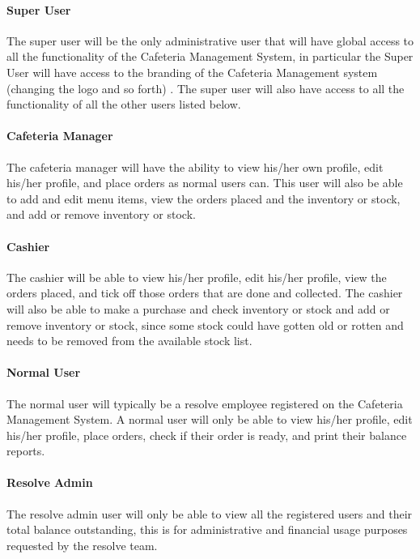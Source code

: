 \documentclass[12pt]{article}
\begin{document}
\paragraph{Super User\\}
The super user will be the only administrative user that will have global access to all the functionality of the Cafeteria Management System, in particular the Super User will have access to the branding of the Cafeteria Management system (changing the logo and so forth) . The super user will also have access to all the functionality of all the other users listed below.

\paragraph{ Cafeteria Manager\\}
The cafeteria manager will have the ability to view his/her own profile, edit his/her profile, and place orders as normal users can. This user will also be able to add and edit menu items, view the orders placed and the inventory or stock, and add or remove inventory or stock. 

\paragraph{ Cashier\\}
The cashier will be able to view his/her profile, edit his/her profile, view the orders placed, and tick off those orders that are done and collected. The cashier will also be able to make a purchase and check inventory or stock and add or remove inventory or stock, since some stock could have gotten old or rotten and needs to be removed from the available stock list. 

\paragraph{ Normal User\\}
The normal user will typically be a resolve employee registered on the Cafeteria Management System.  A normal user will only be able to view his/her profile, edit his/her profile, place orders, check if their order is ready, and print their balance reports.

\paragraph{ Resolve Admin\\}
The resolve admin user will only be able to view all the registered users and their total balance outstanding, this is for administrative and financial usage purposes requested by the resolve team.
\end{document}
